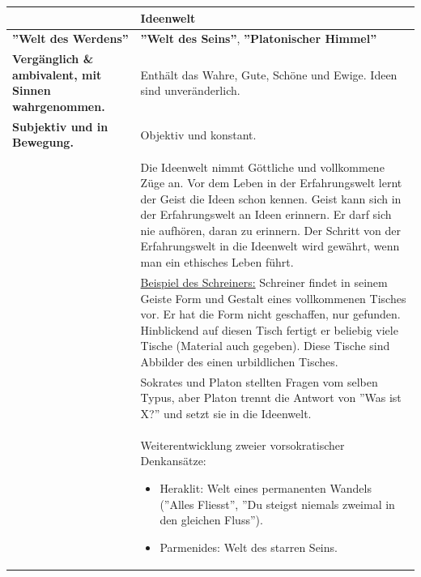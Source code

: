 \begin{longtable}{>{\bfseries}p{}p{}}
					\begin{tabular}{|p{0.33\textwidth}|p{}|}
						\hline
					  	\textbf{Erfahrungswelt} 
					  		& \textbf{Ideenwelt}\\
					  	\hline
					  	\textbf{''Welt des Werdens''}
					  		& \textbf{''Welt des Seins''},\newline
					  			\textbf{''Platonischer Himmel''}\\
					  	Vergänglich \& ambivalent, mit Sinnen wahrgenommen.
						  	& Enthält das Wahre, Gute, Schöne und Ewige. Ideen sind unveränderlich.\\
						Subjektiv und in Bewegung.
							& Objektiv und konstant.\\
						\hline
					\end{tabular}\\
				& Die Ideenwelt nimmt Göttliche und vollkommene Züge an.\newline
					Vor dem Leben in der Erfahrungswelt lernt der Geist die Ideen schon kennen.\newline
					Geist kann sich in der Erfahrungswelt an Ideen erinnern.\newline
					Er darf sich nie aufhören, daran zu erinnern.\newline
					Der Schritt von der Erfahrungswelt in die Ideenwelt wird gewährt, wenn man ein ethisches Leben führt.\\
				& \underline{Beispiel des Schreiners:}\newline
					Schreiner findet in seinem Geiste Form und Gestalt eines vollkommenen Tisches vor.\newline
					Er hat die Form nicht geschaffen, nur gefunden.\newline
					Hinblickend auf diesen Tisch fertigt er beliebig viele Tische (Material auch gegeben).\newline
					Diese Tische sind Abbilder des einen urbildlichen Tisches.\\
				& Sokrates und Platon stellten Fragen vom selben Typus, aber Platon trennt die Antwort von ''Was ist X?'' und setzt sie in die Ideenwelt.\\
				& Weiterentwicklung zweier vorsokratischer Denkansätze:
					\begin{itemize}
					  \item Heraklit: Welt eines permanenten Wandels (''Alles Fliesst'', ''Du steigst niemals zweimal in den gleichen Fluss'').
					  \item Parmenides: Welt des starren Seins.
					\end{itemize}\\
				\hline														 
			\end{longtable}
			
